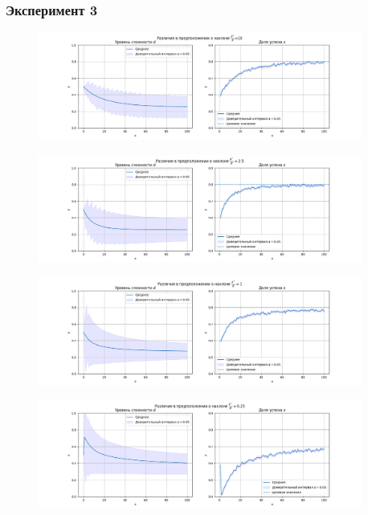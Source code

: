 \subsubsection{Эксперимент 3}
\begin{figure}[h!]
    \centering
    \includegraphics[width=0.95\textwidth]{assets/work/rating/3/0.png}
    \label{exp3:10}
\end{figure}
\begin{figure}[h!]
    \centering
    \includegraphics[width=0.95\textwidth]{assets/work/rating/3/1.png}
    \label{exp3:2_5}
\end{figure}
\begin{figure}[h!]
    \centering
    \includegraphics[width=0.95\textwidth]{assets/work/rating/3/2.png}
    \label{exp3:1}
\end{figure}
\begin{figure}[h!]
    \centering
    \includegraphics[width=0.95\textwidth]{assets/work/rating/3/3.png}
    \label{exp3:_0.25}
\end{figure}
\pagebreak
